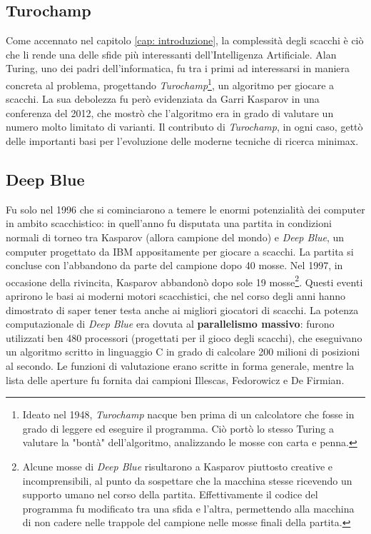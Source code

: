 \subsection{Turochamp}
Come accennato nel capitolo \ref{cap: introduzione}, la complessità degli scacchi è ciò che li rende una delle sfide più interessanti 
dell'Intelligenza Artificiale. Alan Turing, uno dei padri dell'informatica, fu tra i primi ad interessarsi in maniera concreta al problema, progettando 
\textit{Turochamp}\footnote{Ideato nel 1948, \textit{Turochamp} nacque ben prima di un calcolatore che fosse in grado di 
leggere ed eseguire il programma. Ciò portò lo stesso Turing a valutare la "bontà" dell'algoritmo, analizzando le mosse con carta e penna.}, un algoritmo per giocare a scacchi\cite{godena2021eterna}.
La sua debolezza fu però evidenziata da Garri Kasparov in una conferenza del 2012, che mostrò che l'algoritmo era 
in grado di valutare un numero molto limitato di varianti\cite{kasparov2017reconstructing}. Il contributo di \textit{Turochamp}, in ogni caso, gettò delle importanti basi 
per l'evoluzione delle moderne tecniche di ricerca minimax.

\subsection{Deep Blue}
Fu solo nel 1996 che si cominciarono a temere le enormi potenzialità dei computer in ambito scacchistico: in quell'anno fu disputata 
una partita in condizioni normali di torneo tra Kasparov (allora campione del mondo) e \textit{Deep Blue}, un computer progettato 
da IBM appositamente per giocare a scacchi. La partita si concluse con l'abbandono da parte del campione dopo 40 mosse. Nel 1997, in occasione della rivincita, 
Kasparov abbandonò dopo sole 19 mosse\footnote{Alcune mosse di \textit{Deep Blue} risultarono a Kasparov piuttosto creative e incomprensibili,
al punto da sospettare che la macchina stesse ricevendo un supporto umano nel corso della partita. Effettivamente il codice del programma 
fu modificato tra una sfida e l'altra, permettendo alla macchina di non cadere nelle trappole del campione nelle mosse finali della partita.}. 
Questi eventi aprirono le basi ai moderni motori scacchistici, che nel corso degli anni hanno dimostrato di saper tener testa anche 
ai migliori giocatori di scacchi\cite{newborn2012kasparov}.
La potenza computazionale di \textit{Deep Blue} era dovuta al \textbf{parallelismo massivo}: furono utilizzati ben 480 processori (progettati per il gioco degli 
scacchi), che eseguivano un algoritmo scritto in linguaggio C in grado di calcolare 200 milioni di posizioni al secondo. Le funzioni di 
valutazione erano scritte in forma generale, mentre la lista delle aperture fu fornita dai campioni Illescas, Fedorowicz e De Firmian.

